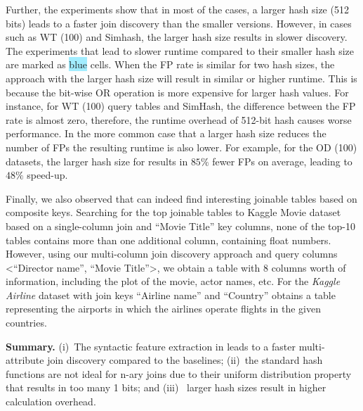
Further, the experiments show that in most of the cases, a larger hash size (512 bits) leads to a faster join discovery than the smaller versions. However, in cases such as WT (100) and Simhash, the larger hash size results in slower discovery. The experiments that lead to slower runtime compared to their smaller hash size are marked as \colorbox[HTML]{A2EDFF}{blue} cells. 
When the FP rate is similar for two hash sizes, the approach with the larger hash size will result in similar or higher runtime. 
This is because the bit-wise OR operation is more expensive for larger hash values.
For instance, for WT (100) query tables and SimHash, the difference between the FP rate is almost zero, therefore, the runtime overhead of 512-bit hash causes worse performance.
In the more common case that a larger hash size reduces the number of FPs the resulting runtime is also lower.
For example, for the OD (100) datasets, the larger hash size for \hash results in $85\%$ fewer FPs on average, leading to $48\%$ speed-up.

Finally, we also observed that \system can indeed find interesting joinable tables based on composite keys. 
Searching for the top joinable tables to Kaggle Movie dataset based on a single-column join and ``Movie Title'' key columns, none of the top-10 tables contains more than one additional column, containing float numbers. However, using our multi-column join discovery approach and query columns <``Director name'', ``Movie Title''>, we obtain a table with 8 columns worth of information, including the plot of the movie, actor names, etc.
For the \textit{Kaggle Airline} dataset with join keys ``Airline name'' and ``Country'' \system obtains a table representing the airports in which the airlines operate flights in the given countries. 

\noindent\textbf{Summary.}
(i)~The syntactic feature extraction in \hash leads to a faster multi-attribute join discovery compared to the baselines;
(ii)~the standard hash functions are not ideal for n-ary joins due to their uniform distribution property that results in too many 1 bits; and
(iii)~ larger hash sizes result in higher calculation overhead.

